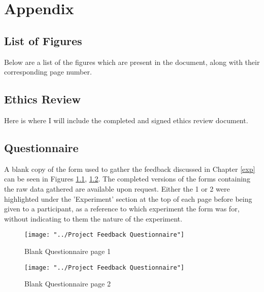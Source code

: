 \chapter{Appendix}
\label{appendix}

\begingroup
	\section{List of Figures}
	\label{appendix:figures}
	
	Below are a list of the figures which are present in the document, along with their corresponding page number.
	
	\renewcommand{\chapter}[2]{}		%
	\listoffigures						%
\endgroup

\section{Ethics Review}
\label{appendix:ethics}
Here is where I will include the completed and signed ethics review document.

\section{Questionnaire}
A blank copy of the form used to gather the feedback discussed in Chapter \ref{exp} can be seen in Figures \ref{appendix:fig:question1}, \ref{appendix:fig:question2}. The completed versions of the forms containing the raw data gathered are available upon request. Either the 1 or 2 were highlighted under the 'Experiment' section at the top of each page before being given to a participant, as a reference to which experiment the form was for, without indicating to them the nature of the experiment.

\begin{figure}
	\texttt{[image: "../Project Feedback Questionnaire"]}
	\centering	
	\caption{Blank Questionnaire page 1}
	\label{appendix:fig:question1}
\end{figure}

\begin{figure}
	\texttt{[image: "../Project Feedback Questionnaire"]}
	\centering	
	\caption{Blank Questionnaire page 2}
	\label{appendix:fig:question2}
\end{figure}